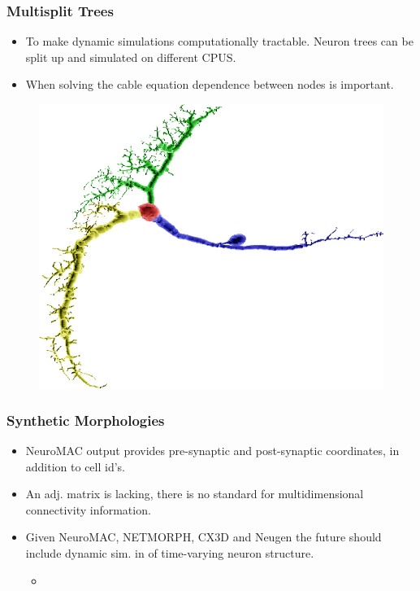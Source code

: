 \documentclass[notes=hide]{beamer}
\begin{document}
{\begin{frame}
\begin{itemize}
\end{itemize}
\end{frame}


\begin{frame}
\frametitle{Multisplit Trees}
\begin{itemize}
\item To make dynamic simulations computationally tractable. Neuron trees can be split up and simulated on different CPUS.
\item When solving the cable equation dependence between nodes is important.
\end{itemize}
\vfill
\begin{figure}
\includegraphics[scale=0.85]{fninf-03-021-g009.jpg}
\end{figure}
\cite{eichner2009neural}
\end{frame}

\begin{frame}
\frametitle{Synthetic Morphologies}
\begin{itemize}
\item NeuroMAC output provides pre-synaptic and post-synaptic coordinates, in addition to cell id's. 
\vfill
\item An adj. matrix is lacking, there is no standard for multidimensional connectivity information.
\vfill
\item Given NeuroMAC, NETMORPH, CX3D and Neugen the future should include dynamic sim. in  of time-varying neuron structure.
\vfill
\begin{itemize}
\item \cite{torben2014context} 
\cite{bito2010chemical}
\cite{eberhard2006neugen}
\end{itemize}
\end{itemize}
\end{frame}

}
\end{document}
